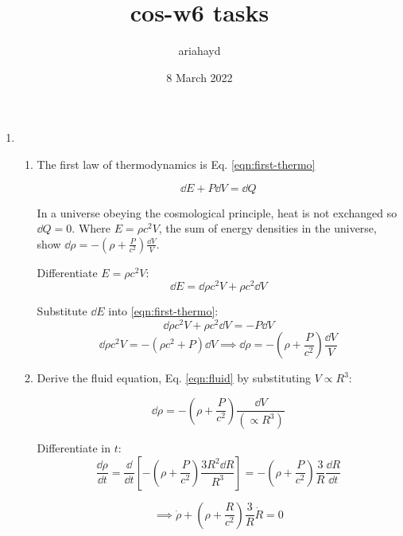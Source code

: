 \documentclass{paper}
\title{cos-w6 tasks}
\author{ariahayd}
\date{8 March 2022}
\begin{document}
 

\maketitle

\begin{enumerate}
    \item %
      \begin{enumerate}
        \item
          The first law of thermodynamics is Eq. \ref{eqn:first-thermo}
          
          \begin{equation}
            \dd{E} + P\dd{V} = \dd{Q}
            \label{eqn:first-thermo}
          \end{equation}
    
          In a universe obeying the cosmological principle, heat is not 
          exchanged so \(\dd{Q} = 0\). Where \(E = \rho c^2 V\), the sum of 
          energy densities in the universe, show 
          \(\dd{\rho} = -(\rho + \frac{P}{c^2}) \frac{\dd{V}}{V}\).
  
          Differentiate \(E = \rho c^2 V\):
          \[ 
            \dd{E} = \dd{\rho}c^2V + \rho c^2\dd{V} 
          \]

          Substitute \(\dd{E}\) into \ref{eqn:first-thermo}:
          \[
            \dd{\rho}c^2V + \rho c^2\dd{V} = -P\dd{V}
          \]
          \[
            \dd{\rho}c^2V = -\left(\rho c^2 + P\right)\dd{V}
            \implies \dd{\rho} 
            = -\left(\rho + \frac{P}{c^2}\right)\frac{\dd{V}}{V}
          \]

        \item
          Derive the fluid equation, Eq. \ref{eqn:fluid} by substituting 
          \(V \propto R^3\):

          \[
            \dd{\rho} = 
            -\left(\rho+\frac{P}{c^2}\right)\frac{\dd{V}}{(\propto R^3)}
          \]

          Differentiate in \(t\):
          \[
            \frac{\dd{\rho}}{\dd{t}} 
            = \frac{\dd{}}{\dd{t}}
            \left[ - \left(\rho+\frac{P}{c^2}\right) 
            \frac{3R^2\dd{R}}{R^3} \right]
            = - \left(\rho + \frac{P}{c^2}\right)
            \frac{3}{R}\frac{\dd{R}}{\dd{t}}
          \]

          \begin{equation}
            \implies
            \dot{\rho} + \left(\rho + \frac{R}{c^2}\right)
            \frac{3}{R} \dot{R} = 0
            \label{eqn:fluid}
          \end{equation}


\end{enumerate}
\end{enumerate}
\end{document}
